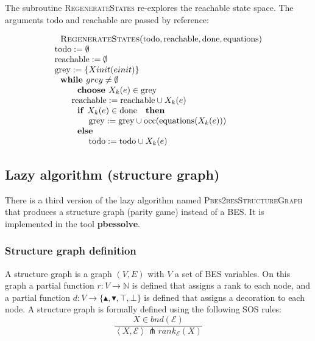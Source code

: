 The subroutine \textsc{RegenerateStates} re-explores the reachable state
space. The arguments $\mathrm{todo}$ and $\mathrm{reachable}$ are passed by
reference:

\begin{equation*}
\begin{array}{l}
\text{\textsc{RegenerateStates}}(\mathrm{todo},\mathrm{reachable},\mathrm{%
done},\mathrm{equations}) \\
\mathrm{todo}:=\emptyset \\
\mathrm{reachable}:=\emptyset \\
\mathrm{grey}:=\{Xinit(einit)\} \\
\text{\textbf{while }}grey\neq \emptyset \\
\qquad \text{\textbf{choose }}X_{k}(e)\in \mathrm{grey} \\
\qquad \mathrm{reachable}:=\mathrm{reachable}\cup X_{k}(e) \\
\qquad \text{\textbf{if }}X_{k}(e)\in \mathrm{done}\text{ \textbf{then }} \\
\qquad \qquad \mathrm{grey}:=\mathrm{grey}\cup \mathrm{occ}(\mathrm{equations%
}(X_{k}(e))) \\
\qquad \text{\textbf{else }} \\
\qquad \qquad \mathrm{todo}:=\mathrm{todo}\cup X_{k}(e)%
\end{array}%
\end{equation*}%
\newpage

\subsection{Lazy algorithm (structure graph)}

There is a third version of the lazy algorithm named \textsc{%
Pbes2besStructureGraph} that produces a structure graph (parity game)
instead of a BES. It is implemented in the tool \textbf{pbessolve}.

\subsubsection{Structure graph definition}

A structure graph is a graph $(V,E)$ with $V$ a set of BES variables. On
this graph a partial function $r:V\rightarrow \mathbb{N}$ is defined that
assigns a rank to each node, and a partial function $d:V\rightarrow
\{\blacktriangle ,\blacktriangledown ,\top ,\bot \}$ is defined that assigns
a decoration to each node. A structure graph is formally defined using the
following SOS rules:%
\begin{equation*}
\frac{X\in bnd(\mathcal{E})}{\left\langle X,\mathcal{E}\right\rangle
\pitchfork rank_{\mathcal{E}}(X)}
\end{equation*}

